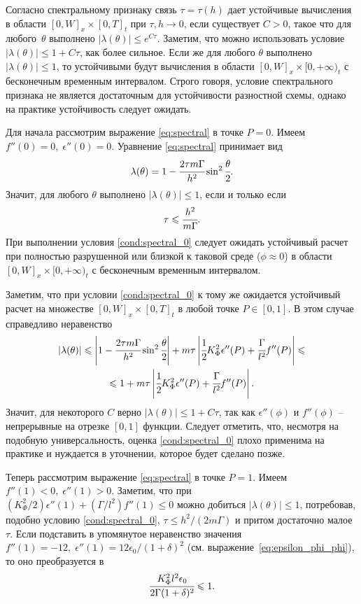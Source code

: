 Согласно спектральному признаку связь $\tau = \tau(h)$ дает устойчивые вычисления в области $[0, W]_x \times [0, T]_t$ при $\tau, h \to 0$, если существует $C > 0$, такое что для любого~$\theta$ выполнено $|\lambda(\theta)| \leqslant e^{C\tau}$. Заметим, что можно использовать условие $|\lambda(\theta)| \leqslant 1 + C\tau$, как более сильное. Если же для любого $\theta$ выполнено $|\lambda(\theta)| \leqslant 1$, то устойчивыми будут вычисления в области $[0, W]_x \times [0, +\infty)_t$ с бесконечным временным интервалом. Строго говоря, условие спектрального признака не является достаточным для устойчивости разностной схемы, однако на практике устойчивость следует ожидать.

Для начала рассмотрим выражение \eqref{eq:spectral} в точке $P = 0$. Имеем $f''(0) = 0, \; \epsilon''(0) = 0$. Уравнение \eqref{eq:spectral} принимает вид
$$\lambda(\theta) = 1 - \cfrac{2 \tau m \Gamma}{h^2} \sin^2 \cfrac{\theta}{2} {\text{.}}$$
Значит, для любого $\theta$ выполнено $|\lambda(\theta)| \leqslant 1$, если и только если
\begin{equation}
	 \tau \leqslant \cfrac{h^2}{m \Gamma} {\text{.}}
	 \label{cond:spectral_0}
\end{equation}
При выполнении условия \eqref{cond:spectral_0} следует ожидать устойчивый расчет при полностью разрушенной или близкой к таковой среде ($\phi \approx 0$) в области $[0, W]_x \times [0, +\infty)_t$ с бесконечным временным интервалом.

Заметим, что при условии \eqref{cond:spectral_0} к тому же ожидается устойчивый расчет на множестве $[0, W]_x \times [0, T]_t$ в любой точке $P \in [0, 1]$. В этом случае справедливо неравенство
\begin{multline*}
	|\lambda(\theta)| \leqslant \left| 1 - \cfrac{2 \tau m \Gamma}{h^2} \sin^2 \cfrac{\theta}{2} \right| + m \tau \left| \cfrac{1}{2} K_\Phi^2 \epsilon''(P) + \cfrac{\Gamma}{l^2} f''(P) \right| \leqslant \\ \leqslant 1 + m \tau \left| \cfrac{1}{2} K_\Phi^2 \epsilon''(P) + \cfrac{\Gamma}{l^2} f''(P) \right| {\text{.}}
\end{multline*}
Значит, для некоторого $C$ верно $|\lambda(\theta)| \leqslant 1 + C \tau$, так как $\epsilon''(\phi)$ и $f''(\phi)$ -- непрерывные на отрезке $[0, 1]$ функции. Следует отметить, что, несмотря на подобную универсальность, оценка \eqref{cond:spectral_0} плохо применима на практике и нуждается в уточнении, которое будет сделано позже.

Теперь рассмотрим выражение \eqref{eq:spectral} в точке $P = 1$. Имеем $f''(1) < 0, \; \epsilon''(1) > 0$. Заметим, что при $(K_\Phi^2 / 2) \epsilon''(1) + (\Gamma / l^2) f''(1) \leqslant 0$ можно добиться $|\lambda(\theta)| \leqslant 1$, потребовав, подобно условию \eqref{cond:spectral_0}, $\tau \leqslant h^2 / (2m \Gamma)$ и притом достаточно малое $\tau$. Если подставить в упомянутое неравенство значения $f''(1) = -12, \; \epsilon''(1) = 12 \epsilon_0 / (1 + \delta)^2$ (см. выражение~\eqref{eq:epsilon_phi_phi}), то оно преобразуется в
\begin{equation}
	\cfrac{K_\Phi^2 l^2 \epsilon_0}{2 \Gamma (1 + \delta)^2} \leqslant 1 {\text{.}}
	\label{cond:spectral_possible_1}
\end{equation}

